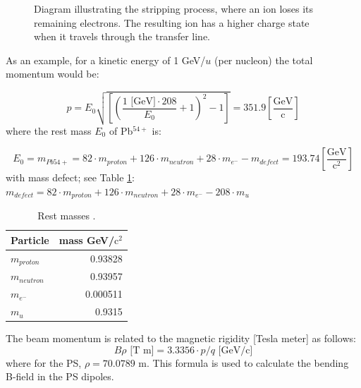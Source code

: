 \documentclass{cernatsnote}
\begin{document}
\begin{figure}
\begin{minipage}{0.45\textwidth}
        \caption{Diagram illustrating the stripping process, where an ion loses its remaining electrons. The resulting ion has a higher charge state when it travels through the transfer line.}
        \label{fig:stripping}
    \end{minipage}
\end{figure}

As an example, for a kinetic energy of 1 GeV/$u$ (per nucleon) the total momentum would be:

$$p = E_{0}\sqrt{\left [ \left( \frac{1\text{ [GeV]}\cdot 208}{E_{0}}+1\right )^{2}-1\right ]} = 351.9 \left[\frac{\text{GeV}}{\text{c}}\right]$$
where the rest mass $E_{0}$ of Pb$^{54+}$ is:

$$E_{0} = m_{Pb54+}= 82\cdot m_{proton} + 126\cdot m_{neutron} + 28\cdot m_{e^{-}} - m_{defect} = 193.74 \left[\frac{\text{GeV}}{\text{c}^{2}}\right]$$
with mass defect; see Table \ref{table:masses}: $m_{defect}=82\cdot m_{proton} + 126\cdot m_{neutron} + 28\cdot m_{e^{-}} - 208\cdot m_{u}$ 

\begin{table}[h!]
\centering
\begin{tabular}{lr}
\toprule
Particle & mass GeV/$\text{c}^{2}$\\
\midrule
$m_{proton}$ & 0.93828      \\
$m_{neutron}$ & 0.93957      \\
$m_{e^{-}}$ & 0.000511 \\
$m_{u}$ & 0.9315       \\
\bottomrule
\end{tabular}
\caption{Rest masses \cite{boston_university_nuclear_nodate}.}
\label{table:masses}
\end{table}

The beam momentum is related to the magnetic rigidity [Tesla meter] as follows: 
$$B\rho \text{ [T m]} = 3.3356\cdot p/q \text{ [GeV/c]}$$
where for the PS, $\rho = 70.0789$ m. This formula is used to calculate the bending B-field in the PS dipoles.
\\
\end{document}
